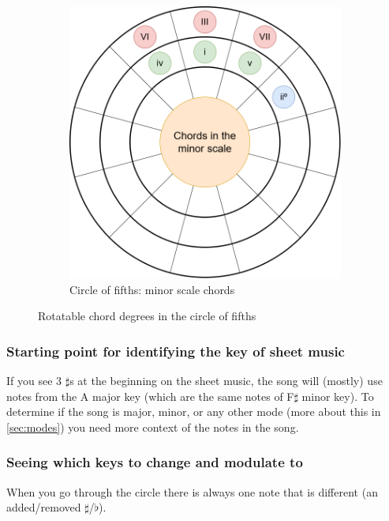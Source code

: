 \begin{figure}[h]
\begin{subfigure}{0.47\textwidth}
		\includegraphics[width=\textwidth]{../../Images/CircleOfFifthsChordsInTheMinorScale.png}
		\caption{Circle of fifths: minor scale chords}
		\label{fig:circle_of_fifths_minor_scale_chords}
	\end{subfigure}
	\caption{Rotatable chord degrees in the circle of fifths}
\end{figure}

\newpage

\subsubsection{Starting point for identifying the key of sheet music}

If you see 3 $\sharp$s at the beginning on the sheet music, the song will (mostly) use notes from the A major key (which are the same notes of F$\sharp$ minor key). To determine if the song is major, minor, or any other mode (more about this in \autoref{sec:modes}) you need more context of the notes in the song.

\subsubsection{Seeing which keys to change and modulate to}

When you go through the circle there is always one note that is different (an added/removed $\sharp$/$\flat$).

